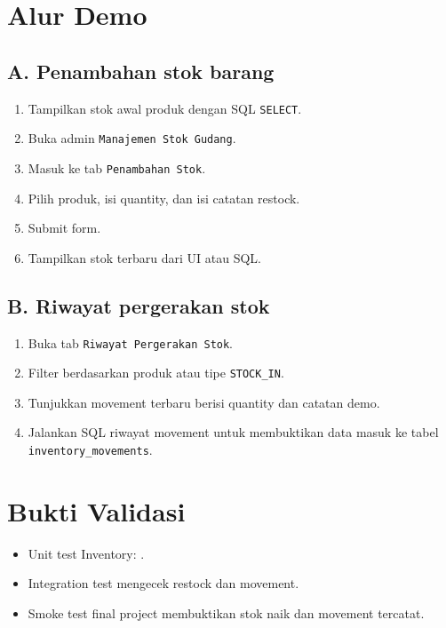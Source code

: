 \documentclass[11pt,a4paper]{article}
\begin{document}
\section*{Alur Demo}
\subsection*{A. Penambahan stok barang}
\begin{enumerate}
\item Tampilkan stok awal produk dengan SQL \texttt{SELECT}.
\item Buka admin \texttt{Manajemen Stok Gudang}.
\item Masuk ke tab \texttt{Penambahan Stok}.
\item Pilih produk, isi quantity, dan isi catatan restock.
\item Submit form.
\item Tampilkan stok terbaru dari UI atau SQL.
\end{enumerate}

\subsection*{B. Riwayat pergerakan stok}
\begin{enumerate}
\item Buka tab \texttt{Riwayat Pergerakan Stok}.
\item Filter berdasarkan produk atau tipe \texttt{STOCK\_IN}.
\item Tunjukkan movement terbaru berisi quantity dan catatan demo.
\item Jalankan SQL riwayat movement untuk membuktikan data masuk ke tabel \texttt{inventory\_movements}.
\end{enumerate}

\section*{Bukti Validasi}
\begin{itemize}
\item Unit test Inventory: .
\item Integration test mengecek restock dan movement.
\item Smoke test final project membuktikan stok naik dan movement tercatat.
\end{itemize}
\end{document}
